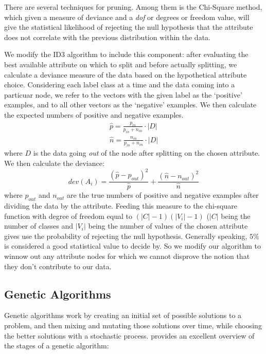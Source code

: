 \documentclass[12pt, letterpaper]{article}
\begin{document}
There are several techniques for pruning. Among them is the Chi-Square method, which given a measure of deviance and a \emph{dof} or degrees or freedom value, will give the statistical likelihood of rejecting the null hypothesis that the attribute does not correlate with the previous distribution within the data. 

We modify the ID3 algorithm to include this component: after evaluating the best available attribute on which to split and before actually splitting, we calculate a deviance measure of the data based on the hypothetical attribute choice. Considering each label class at a time and the data coming into a particuar node, we refer to the vectors with the given label as the `positive' examples, and to all other vectors as the `negative' examples. We then calculate the expected numbers of positive and negative examples.
\begin{eqnarray}
    \hat{p} = \frac{p_{in}}{p_{in}+n_{in}} \cdot |D|\\
    \hat{n} = \frac{n_{in}}{p_{in}+n_{in}} \cdot |D|
\end{eqnarray}
where $D$ is the data going \emph{out} of the node after splitting on the chosen attribute. We then calculate the deviance:
\begin{equation}
    dev(A_i) = \frac{(\hat{p} - p_{out})^2}{\hat{p}} + \frac{(\hat{n} - n_{out})^2}{\hat{n}}
\end{equation}
where $p_{out}$ and $n_{out}$ are the true numbers of positive and negative examples after dividing the data by the attribute. Feeding this measure to the chi-square function with degree of freedom equal to $(|C| - 1)(|V_i| - 1) $ ($|C|$ being the number of classes and $|V_i|$ being the number of values of the chosen attribute gives use the probability of rejecting the null hypothesis. Generally speaking, $5\%$ is considered a good statistical value to decide by. So we modify our algorithm to winnow out any attribute nodes for which we cannot disprove the notion that they don't contribute to our data.

\subsection{Genetic Algorithms}
Genetic algorithms work by creating an initial set of possible solutions to a problem, and then mixing and mutating those solutions over time, while choosing the better solutions with a stochastic process. \cite{melanie1999introduction} provides an excellent overview of the stages of a genetic algorithm:
\end{document}
